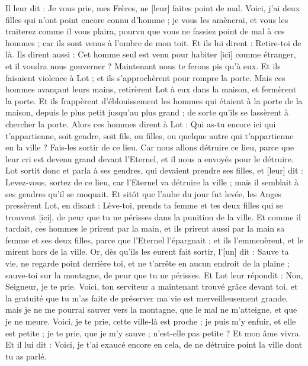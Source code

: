 \begin{multicols}{2}
Il leur dit : Je vous prie, mes Frères, ne [leur] faites point de mal.
Voici, j'ai deux filles qui n'ont point encore connu d'homme ; je vous les amènerai, et vous les traiterez comme il vous plaira, pourvu que vous ne fassiez point de mal à ces hommes ; car ils sont venus à l'ombre de mon toit.
Et ils lui dirent : Retire-toi de là. Ils dirent aussi : Cet homme seul est venu pour habiter [ici] comme étranger, et il voudra nous gouverner ? Maintenant nous te ferons pis qu'à eux. Et ils faisaient violence à Lot ; et ils s'approchèrent pour rompre la porte.
Mais ces hommes avançant leurs mains, retirèrent Lot à eux dans la maison, et fermèrent la porte.
Et ils frappèrent d'éblouissement les hommes qui étaient à la porte de la maison, depuis le plus petit jusqu'au plus grand ; de sorte qu'ils se lassèrent à chercher la porte.
Alors ces hommes dirent à Lot : Qui as-tu encore ici qui t'appartienne, soit gendre, soit fils, ou filles, ou quelque autre qui t'appartienne en la ville ? Fais-les sortir de ce lieu.
Car nous allons détruire ce lieu, parce que leur cri est devenu grand devant l'Eternel, et il nous a envoyés pour le détruire.
Lot sortit donc et parla à ses gendres, qui devaient prendre ses filles, et [leur] dit : Levez-vous, sortez de ce lieu, car l'Eternel va détruire la ville ; mais il semblait à ses gendres qu'il se moquait.
Et sitôt que l'aube du jour fut levée, les Anges pressèrent Lot, en disant : Lève-toi, prends ta femme et tes deux filles qui se trouvent [ici], de peur que tu ne périsses dans la punition de la ville.
Et comme il tardait, ces hommes le prirent par la main, et ils prirent aussi par la main sa femme et ses deux filles, parce que l'Eternel l'épargnait ; et ils l'emmenèrent, et le mirent hors de la ville.
Or, dès qu'ils les eurent fait sortir, l'[un] dit : Sauve ta vie, ne regarde point derrière toi, et ne t'arrête en aucun endroit de la plaine ; sauve-toi sur la montagne, de peur que tu ne périsses.
Et Lot leur répondit : Non, Seigneur, je te prie.
Voici, ton serviteur a maintenant trouvé grâce devant toi, et la gratuité que tu m'as faite de préserver ma vie est merveilleusement grande, mais je ne me pourrai sauver vers la montagne, que le mal ne m'atteigne, et que je ne meure.
Voici, je te prie, cette ville-là est proche ; je puis m'y enfuir, et elle est petite ; je te prie, que je m'y sauve ; n'est-elle pas petite ? Et mon âme vivra.
Et il lui dit : Voici, je t'ai exaucé encore en cela, de ne détruire point la ville dont tu as parlé.

\end{multicols}
